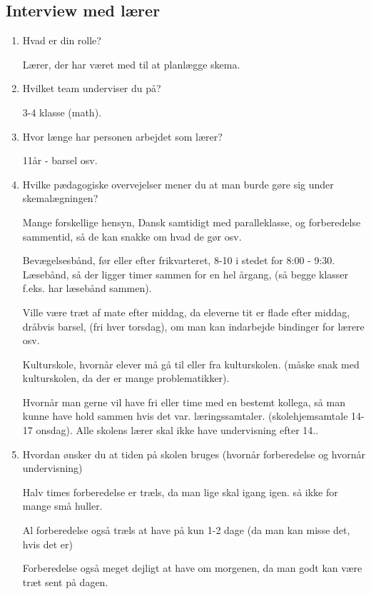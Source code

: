 \subsection{Interview med lærer}
\label{InterviewLaerer}
\begin{enumerate}
	\item Hvad er din rolle?
    
    Lærer, der har været med til at planlægge skema.
   
   
    \item Hvilket team underviser du på?
	    
	3-4 klasse (math).
    
    
    \item Hvor længe har personen arbejdet som lærer?
	    
	11år - barsel osv.
    
    
    \item Hvilke pædagogiske overvejelser mener du at man burde gøre sig under skemalægningen?
		
	Mange forskellige hensyn, Dansk samtidigt med paralleklasse, og forberedelse sammentid, så de kan snakke om hvad de gør osv. 
	
	Bevægelsesbånd, før eller efter frikvarteret, 8-10 i stedet for 8:00 - 9:30. Læsebånd, så der ligger timer sammen for en hel årgang, (så begge klasser f.eks. har læsebånd sammen).
	
	Ville være træt af mate efter middag, da eleverne tit er flade efter middag, dråbvis barsel, (fri hver torsdag), om man kan indarbejde bindinger for lærere osv. 
		
	Kulturskole, hvornår elever må gå til eller fra kulturskolen. (måske snak med kulturskolen, da der er mange problematikker).
	
	Hvornår man gerne vil have fri eller time med en bestemt kollega, så man kunne have hold sammen hvis det var. læringssamtaler. (skolehjemsamtale 14-17 onsdag). Alle skolens lærer skal ikke have undervisning efter 14.. 
		
    
    \item Hvordan ønsker du at tiden på skolen bruges (hvornår forberedelse og hvornår undervisning)
    
    Halv times forberedelse er træls, da man lige skal igang igen. så ikke for mange små huller. 
	
	Al forberedelse også træls at have på kun 1-2 dage (da man kan misse det, hvis det er)
	
	Forberedelse også meget dejligt at have om morgenen, da man godt kan være træt sent på dagen.
    

\end{enumerate}
